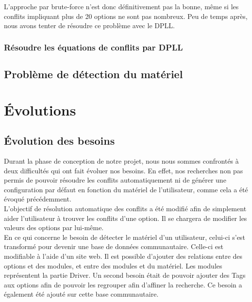 \documentclass[16pts]{report}
\begin{document}
L'approche par brute-force n'est donc définitivement pas la bonne, même si les
conflits impliquant plus de 20 options ne sont pas nombreux. Peu de temps après,
nous avons tenter de résoudre ce problème avec le DPLL.\\


            \subsubsection{Résoudre les équations de conflits par DPLL}
            \label{sub:Résoudre les équations de conflits par DPLL}

        \subsection{Problème de détection du matériel}
        \label{sub:Problème de détection du matériel}

    \section{Évolutions}
    \label{sec:Évolutions}
        \subsection{Évolution des besoins}
        \label{sec:Évolution des besoins}

Durant la phase de conception de notre projet, nous nous sommes confrontés à
deux difficultés qui ont fait évoluer nos besoins. En effet, nos recherches non
pas permis de pouvoir résoudre les conflits automatiquement ni de générer une
configuration par défaut en fonction du matériel de l'utilisateur, comme cela a
été évoqué précédemment.  \\

L'objectif de résolution automatique des conflits a été modifié afin de
simplement aider l'utilisateur à trouver les conflits d'une option. Il se
chargera de modifier les valeurs des options par lui-même.  \\

En ce qui concerne le besoin de détecter le matériel d'un utilisateur, celui-ci
s'est transformé pour devenir une base de données communautaire. Celle-ci est
modifiable à l'aide d'un site web. Il est possible d'ajouter des relations
entre des options et des modules, et entre des modules et du matériel. Les
modules représentent la partie Driver. Un second besoin était de pouvoir
ajouter des Tags aux options afin de pouvoir les regrouper afin d'affiner la
recherche. Ce besoin a également été ajouté sur cette base communautaire.
\end{document}

